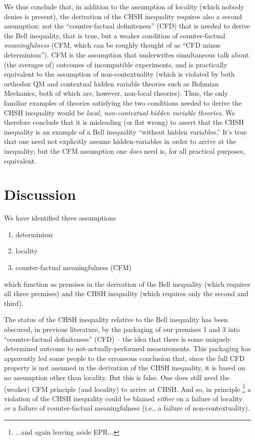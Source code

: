 \documentclass[aps,prc,onecolumn,12pt]{revtex4-2}
\begin{document}
We thus conclude that, in addition to the assumption of locality
(which nobody denies is present), the derivation of the CHSH inequality
requires also a second assumption:  not the ``counter-factual
definiteness'' (CFD) that is needed to derive the Bell inequality, that is
true, but a weaker condition of counter-factual \emph{meaningfulness}
(CFM, which can be roughly thought of as ``CFD minus determinism'').
CFM is the assumption that underwrites simultaneous talk about (the
averages of) outcomes of incompatible experiments, and is practically
equivalent to the assumption of non-contextuality (which is violated
by both orthodox QM and contextual hidden variable theories such
as Bohmian Mechanics, both of which are, however, non-local theories).  
Thus, the only familiar examples of theories satisfying the two
conditions needed to derive the CHSH inequality would be \emph{local,
non-contextual hidden variable theories}.  We therefore conclude that
it is misleading (or flat wrong) to assert that the CHSH inequality is
an example of a Bell inequality ``without hidden
variables.'' \cite{eberhard}   It's true that one need not explicitly assume
hidden-variables in order to arrive at the inequality; but the CFM
assumption one \emph{does} need is, for all practical purposes,
equivalent.  



\section{Discussion}

We have identified three assumptions 
\begin{enumerate}
\item determinism
\item locality
\item counter-factual meaningfulness (CFM)
\end{enumerate}
which function as premises in the derivation of the Bell inequality
(which requires all three premises) and the CHSH inequality (which
requires only the second and third).  

The status of the CHSH inequality relative to the Bell inequality has
been obscured, in previous literature, by the packaging of our
premises 1 and 3 into ``counter-factual definiteness'' (CFD) -- the
idea that there is some uniquely determined outcome to
not-actually-performed measurements.  This packaging has apparently
led some people to the erroneous conclusion that, since the full CFD
property is not assumed in the derivation of the CHSH inequality, it
is based on no assumption other than locality.  But this is false.
One does still need the (weaker) CFM principle (and locality) to
arrive at CHSH.  And so, in principle \footnote{...and again leaving
  aside EPR...} a violation of the CHSH inequality could be blamed
\emph{either} on a failure of locality \emph{or} a failure of
counter-factual meaningfulness (i.e., a failure of non-contextuality).  
\end{document}
